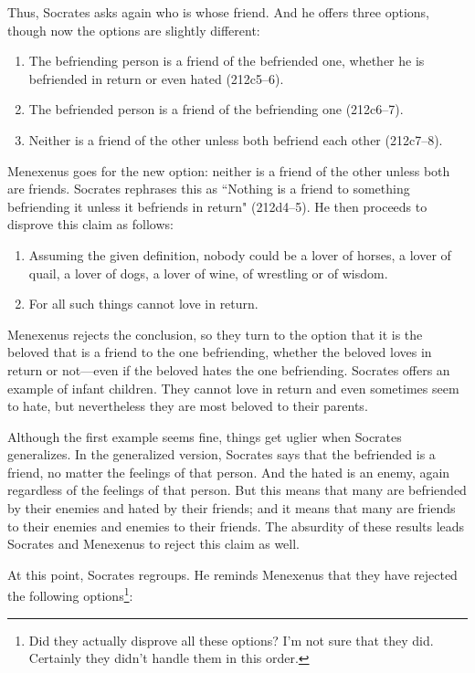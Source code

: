 \documentclass[11pt]{article}
\begin{document}
Thus, Socrates asks again who is whose friend. And he offers three options, though now the options are slightly different:

\begin{enumerate}
    \item The befriending person is a friend of the befriended one, whether he is befriended in return or even hated (212c5--6).
    \item The befriended person is a friend of the befriending one (212c6--7).
    \item Neither is a friend of the other unless both befriend each other (212c7--8).
\end{enumerate}

Menexenus goes for the new option: neither is a friend of the other unless both are friends.  Socrates rephrases this as ``Nothing is a friend to something befriending it unless it befriends in return" (212d4--5).  He then proceeds to disprove this claim as follows:

\begin{enumerate}
    \item Assuming the given definition, nobody could be a lover of horses, a lover of quail, a lover of dogs, a lover of wine, of wrestling or of wisdom.
    \item For all such things cannot love in return.
\end{enumerate}

Menexenus rejects the conclusion, so they turn to the option that it is the beloved that is a friend to the one befriending, whether the beloved loves in return or not---even if the beloved hates the one befriending.  Socrates offers an example of infant children.  They cannot love in return and even sometimes seem to hate, but nevertheless they are most beloved to their parents.

Although the first example seems fine, things get uglier when Socrates generalizes.  In the generalized version, Socrates says that the befriended is a friend, no matter the feelings of that person. And the hated is an enemy, again regardless of the feelings of that person.  But this means that many are befriended by their enemies and hated by their friends; and it means that many are friends to their enemies and enemies to their friends.  The absurdity of these results leads Socrates and Menexenus to reject this claim as well.

At this point, Socrates regroups.  He reminds Menexenus that they have rejected the following options\footnote{Did they actually disprove all these options?  I'm not sure that they did.  Certainly they didn't handle them in this order.}:
\end{document}

